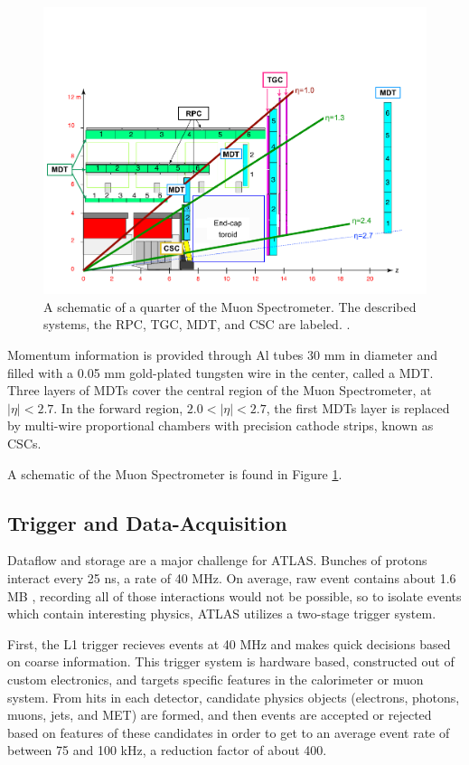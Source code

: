 \begin{figure}[!ht]
    \centering
    \includegraphics[width=.9\textwidth]{chapters/chapter2_experiment/images/muon_detector.png}
    \caption{A schematic of a quarter of the Muon Spectrometer. The described systems, the \gls{RPC}, \gls{TGC}, \gls{MDT}, and \gls{CSC} are labeled. \cite{muon-performance2015}.}
    \label{fig:muon-schematic}
\end{figure}


Momentum information is provided through Al tubes 30 mm in diameter and filled with a 0.05 mm gold-plated tungsten wire in the center, called a \gls{MDT}. Three layers of \glspl{MDT} cover the central region of the Muon Spectrometer, at $|\eta| < 2.7$. In the forward region, $2.0<|\eta|<2.7$, the first \glspl{MDT} layer is replaced by multi-wire proportional chambers with precision cathode strips, known as \glspl{CSC}.

A schematic of the Muon Spectrometer is found in Figure \ref{fig:muon-schematic}.

\subsection{Trigger and Data-Acquisition} \label{ssec:tdaq}

Dataflow and storage are a major challenge for ATLAS. Bunches of protons interact every 25 ns, a rate of 40 MHz. On average, raw event contains about 1.6 MB \cite{ATLASfact-sheet}, recording all of those interactions would not be possible, so to isolate events which contain interesting physics, ATLAS utilizes a two-stage trigger system.

First, the \gls{L1} trigger recieves events at 40 MHz and makes quick decisions based on coarse information. This trigger system is hardware based, constructed out of custom electronics, and targets specific features in the calorimeter or muon system. From hits in each detector, candidate physics objects (electrons, photons, muons, jets, and \gls{MET}) are formed, and then events are accepted or rejected based on features of these candidates in order to get to an average event rate of between 75 and 100 kHz, a reduction factor of about 400.

